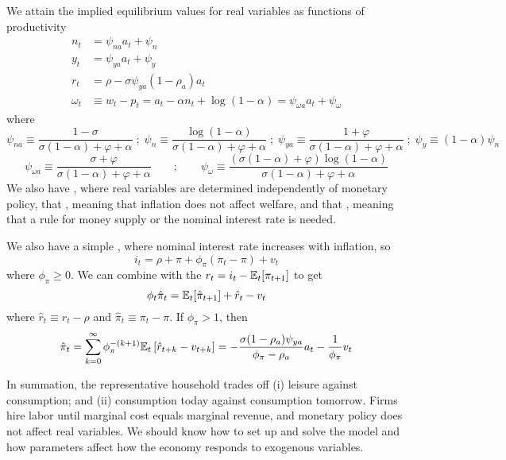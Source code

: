 \documentclass[10pt]{article}
\begin{document}
\begin{model}
\begin{definition}
	We attain the implied equilibrium values for real variables as functions of productivity
	\begin{align*}
		n_t &= \psi_{na} a_t + \psi_n \\
		y_t &= \psi_{ya}a_t + \psi_y \\ 
		r_t &= \rho - \sigma \psi_{ya} (1-\rho_a)a_t \\
		\omega_t &\equiv w_t - p_t = a_t - \alpha n_t + \log(1-\alpha) = \psi_{\omega a}a_t + \psi_\omega
	\end{align*}
	where
	\[\psi_{na}\equiv \frac{1-\sigma}{\sigma(1-\alpha)+\varphi+\alpha} \;;\; \psi_n \equiv \frac{\log(1-\alpha)}{\sigma(1-\alpha) + \varphi + \alpha}\;;\; \psi_{ya} \equiv \frac{1+\varphi}{\sigma (1-\alpha) + \varphi + \alpha} \;;\; \psi_y \equiv (1-\alpha)\psi_n \]
	\[
	\psi_{\omega a} \equiv \frac{\sigma + \varphi}{\sigma(1-\alpha) + \varphi + \alpha} \qquad ; \qquad \psi_\omega \equiv \frac{(\sigma(1-\alpha) + \varphi)\log(1-\alpha)}{\sigma(1-\alpha) + \varphi + \alpha}
	\]
	We also have , where real variables are determined independently of monetary policy, that , meaning that inflation does not affect welfare, and that , meaning that a rule for money supply or the nominal interest rate is needed.
\end{definition}
\end{model}

\begin{definition}
	We also have a simple , where nominal interest rate increases with inflation, so \[i_t = \rho + \pi + \phi_{\pi} (\pi_t - \pi) + v_t\]where $\phi_\pi \ge 0$. We can combine with the  $r_t = i_t - \mathbb{E}_t[\pi_{t+1}]$ to get\[\phi_t \hat{\pi}_t = \mathbb{E}_t[\hat{\pi}_{t+1}] + \hat{r}_t - v_t\]where $\hat{r}_t \equiv r_t - \rho$ and $\hat{\pi}_t\equiv \pi_t - \pi$. If $\phi_\pi > 1$, then\[\hat{\pi}_t = \sum_{k=0}^\infty \phi_\pi^{-(k+1)} \mathbb{E}_t \left[ \hat{r}_{t+k} - v_{t+k}\right] = - \frac{\sigma (1-\rho_a)\psi_{ya}}{\phi_\pi - \rho_a} a_t - \frac{1}{\phi_\pi}v_t\]
\end{definition}

\begin{remark}
	In summation, the representative household trades off (i) leisure against consumption; and (ii) consumption today against consumption tomorrow. Firms hire labor until marginal cost equals marginal revenue, and monetary policy does not affect real variables. We should know how to set up and solve the model and how parameters affect how the economy responds to exogenous variables.
\end{remark}
\end{document}
